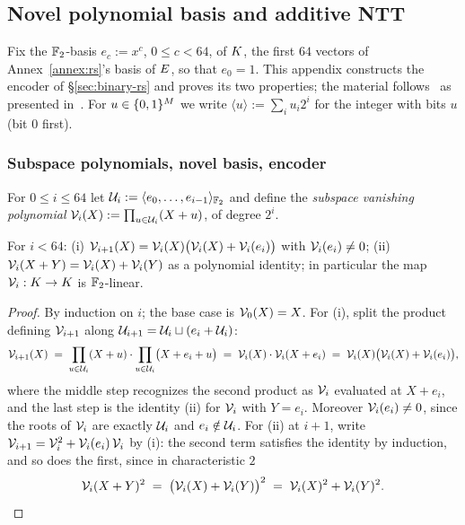 \subsection{Novel polynomial basis and additive NTT}\label{app:ntt}

Fix the $\mathbb{F}_2$-basis $e_c := x^c$, $0 \le c < 64$, of $K$, the first $64$ vectors of Annex~\ref{annex:rs}'s basis of $E$, so that $e_0 = 1$. This appendix constructs the encoder of \S\ref{sec:binary-rs} and proves its two properties; the material follows~\cite{LCH14} as presented in~\cite{DP24}. For $u \in \{0,1\}^{M}$ we write $\langle u \rangle := \sum_i u_i 2^i$ for the integer with bits $u$ (bit $0$ first).

\subsubsection{Subspace polynomials, novel basis, encoder}

For $0 \le i \le 64$ let $\mathcal{U}_i := \langle e_0, \dots, e_{i-1} \rangle_{\mathbb{F}_2}$ and define the \emph{subspace vanishing polynomial} $\mathcal{V}_i(X) := \prod_{u \in \mathcal{U}_i}(X + u)$, of degree $2^i$.

\begin{lemma}\label{lem:subspace}
For $i < 64$: (i) $\mathcal{V}_{i+1}(X) = \mathcal{V}_i(X)\bigl(\mathcal{V}_i(X) + \mathcal{V}_i(e_i)\bigr)$ with $\mathcal{V}_i(e_i) \neq 0$; (ii) $\mathcal{V}_i(X + Y) = \mathcal{V}_i(X) + \mathcal{V}_i(Y)$ as a polynomial identity; in particular the map $\mathcal{V}_i : K \to K$ is $\mathbb{F}_2$-linear.
\end{lemma}

\begin{proof}
By induction on $i$; the base case is $\mathcal{V}_0(X) = X$. For (i), split the product defining $\mathcal{V}_{i+1}$ along $\mathcal{U}_{i+1} = \mathcal{U}_i \sqcup (e_i + \mathcal{U}_i)$:
\[
\mathcal{V}_{i+1}(X) \;=\; \prod_{u \in \mathcal{U}_i} (X + u) \cdot \prod_{u \in \mathcal{U}_i} \bigl(X + e_i + u\bigr) \;=\; \mathcal{V}_i(X) \cdot \mathcal{V}_i(X + e_i) \;=\; \mathcal{V}_i(X) \bigl( \mathcal{V}_i(X) + \mathcal{V}_i(e_i) \bigr),
\]
where the middle step recognizes the second product as $\mathcal{V}_i$ evaluated at $X + e_i$, and the last step is the identity (ii) for $\mathcal{V}_i$ with $Y = e_i$. Moreover $\mathcal{V}_i(e_i) \neq 0$, since the roots of $\mathcal{V}_i$ are exactly $\mathcal{U}_i$ and $e_i \notin \mathcal{U}_i$. For (ii) at $i + 1$, write $\mathcal{V}_{i+1} = \mathcal{V}_i^2 + \mathcal{V}_i(e_i)\, \mathcal{V}_i$ by (i): the second term satisfies the identity by induction, and so does the first, since in characteristic $2$
\[
\mathcal{V}_i(X+Y)^2 \;=\; \bigl(\mathcal{V}_i(X) + \mathcal{V}_i(Y)\bigr)^2 \;=\; \mathcal{V}_i(X)^2 + \mathcal{V}_i(Y)^2 . \qedhere
\]
\end{proof}

